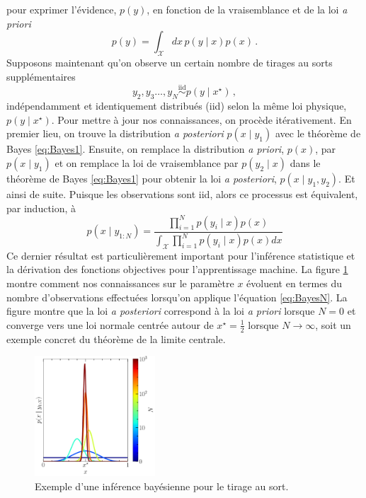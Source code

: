 pour exprimer l'évidence, $p(y)$, en fonction de la vraisemblance et de la loi \textit{a priori} 
\begin{equation}
        p(y) = \int_\mathcal{X} dx\, p(y \mid x) p(x)\, .
\end{equation} 
Supposons maintenant qu'on observe un certain nombre de tirages au sorts supplémentaires
\begin{equation*}
        y_2,y_3\dots,y_N \overset{\mathrm{iid}}{\sim} p(y \mid x^{\star})\, ,
\end{equation*}
indépendamment et identiquement distribués (iid) selon la même loi physique, $p(y \mid x^{\star})$. Pour mettre à jour nos connaissances, on procède 
itérativement. En premier lieu, on trouve la distribution \textit{a posteriori} $p(x \mid y_1)$ avec le théorème de Bayes \eqref{eq:Bayes1}. Ensuite, 
on remplace la distribution \textit{a priori}, $p(x)$, par $p(x \mid y_1)$ et on remplace la loi de vraisemblance par $p(y_2 \mid x)$ dans le théorème de Bayes \eqref{eq:Bayes1} 
pour obtenir la loi \textit{a posteriori}, $p(x \mid y_1, y_2)$. Et ainsi de suite.
Puisque les observations sont iid, alors ce processus est équivalent, par induction, à 
\begin{equation}\label{eq:BayesN}
        p(x \mid y_{1:N}) = \frac{\prod_{i=1}^{N} p(y_i \mid x) p(x)}{\int_\mathcal{X} \prod_{i=1}^{N}p(y_{i} \mid x) p(x) dx}
\end{equation} 
Ce dernier résultat est particulièrement important pour l'inférence statistique et la dérivation des fonctions 
objectives pour l'apprentissage machine. La figure \ref{fig:bayes update} montre comment nos connaissances 
sur le paramètre $x$ évoluent en termes du nombre d'observations effectuées lorsqu'on applique l'équation \eqref{eq:BayesN}. 
La figure montre que la loi \textit{a posteriori} correspond à la loi \textit{a priori} lorsque $N = 0$ 
et converge vers une loi normale centrée autour de $x^{\star}=\frac{1}{2}$ lorsque $N \rightarrow \infty$, 
soit un exemple concret du théorème de la limite centrale.
\begin{figure}[H]
        \centering
        \includegraphics[width=0.4\textwidth]{notebooks/toy_coin_toss.pdf}
        \caption{Exemple d'une inférence bayésienne pour le tirage au sort.}
        \label{fig:bayes update}
\end{figure}

